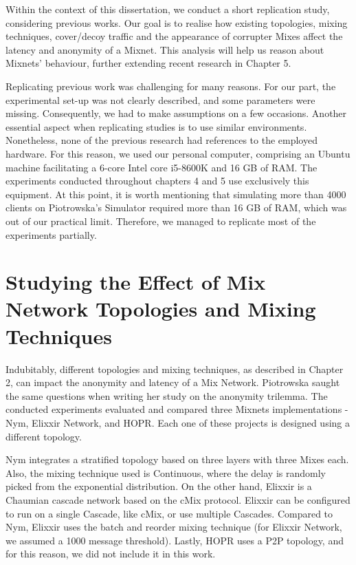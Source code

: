 \documentclass[logo,msc,cyber]{infthesis}   %
\begin{document}
Within the context of this dissertation, we conduct a short replication study,
considering previous works\cite{piotrowska2021studying,ben2021mixim}. Our goal
is to realise how existing topologies, mixing techniques, cover/decoy traffic
and the appearance of corrupter Mixes affect the latency and anonymity of a
Mixnet. This analysis will help us reason about Mixnets' behaviour, further
extending recent research in Chapter 5.

Replicating previous work was challenging for many reasons. For our part, the
experimental set-up was not clearly described, and some parameters were missing.
Consequently, we had to make assumptions on a few occasions. Another essential
aspect when replicating studies is to use similar environments. Nonetheless,
none of the previous research had references to the employed hardware. For this
reason, we used our personal computer, comprising an Ubuntu machine facilitating
a 6-core Intel core i5-8600K and 16 GB of RAM. The experiments conducted
throughout chapters 4 and 5 use exclusively this equipment. At this point, it is
worth mentioning that simulating more than 4000 clients on Piotrowska's
Simulator required more than 16 GB of RAM, which was out of our practical limit.
Therefore, we managed to replicate most of the experiments partially. 

\section{Studying the Effect of Mix Network Topologies and Mixing Techniques}

Indubitably, different topologies and mixing techniques, as described in Chapter
2, can impact the anonymity and latency of a Mix Network. Piotrowska saught the
same questions when writing her study on the anonymity
trilemma\cite{piotrowska2021studying}. The conducted experiments evaluated and
compared three Mixnets implementations - Nym, Elixxir Network, and HOPR. Each
one of these projects is designed using a different topology. 

Nym integrates a stratified topology based on three layers with three Mixes
each. Also, the mixing technique used is Continuous, where the delay is randomly
picked from the exponential distribution. On the other hand, Elixxir is a
Chaumian cascade network based on the cMix protocol\cite{chaum2017cmix}. Elixxir
can be configured to run on a single Cascade, like cMix, or use multiple
Cascades. Compared to Nym, Elixxir uses the batch and reorder mixing technique
(for Elixxir Network, we assumed a 1000 message threshold). Lastly, HOPR uses a
P2P topology, and for this reason, we did not include it in this work.
\end{document}
